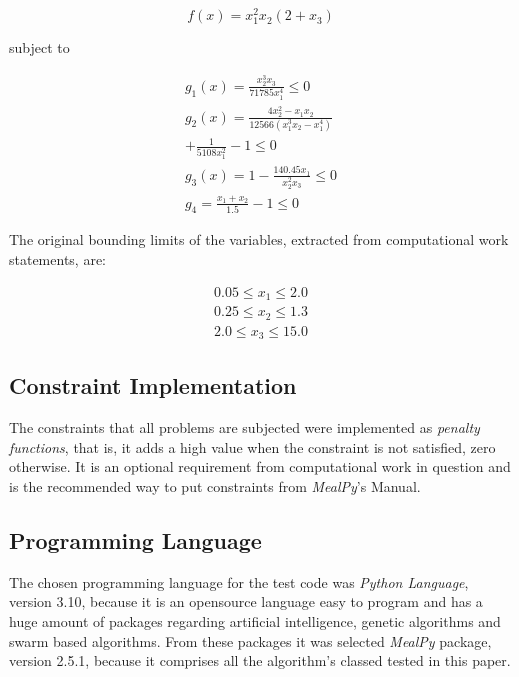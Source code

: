 \documentclass[conference]{IEEEtran}
\begin{document}
\begin{equation}
    f (x) = x_1^2 x_2 (2 + x_3)
\end{equation}

subject to

\begin{equation}
    \begin{split}
        g_1(x) = \frac{x_2^3 x_3}{71785 x_1^4} \leq 0\\
        g_2(x) = \frac{4 x_2^2 - x_1 x_2}{12566 \left( x_1^3 x_2 - x_1^4\right)}\\
        + \frac{1}{5108 x_1^2} -1 \leq 0\\
        g_3(x) = 1 - \frac{140.45 x_1}{x_2^2 x_3} \leq 0\\
        g_4 = \frac{x_1 + x_2}{1.5} - 1 \leq 0
    \end{split}
\end{equation}

The original bounding limits of the variables, extracted from computational work
statements, are:

\begin{equation}
    \begin{split}
        0.05 \leq x_1 \leq 2.0\\
        0.25 \leq x_2 \leq 1.3\\
        2.0 \leq x_3 \leq 15.0
    \end{split}
\end{equation}

\subsection{Constraint Implementation}
\label{subsec:methodology-constraint-implementation}
The constraints that all problems are subjected were implemented as \textit{penalty functions},
that is, it adds a high value when the constraint is not satisfied, zero otherwise. It is an optional requirement
from computational work in question and is the recommended way to put constraints from \textit{MealPy}'s
Manual.

\subsection{Programming Language}
\label{subsec:methodology-programming-language}

The chosen programming language for the test code was \textit{Python Language}, version 3.10, because it is an opensource language easy to
program and has a huge amount of packages regarding artificial intelligence, genetic algorithms and swarm based algorithms.
From these packages it was selected \textit{MealPy} package, version 2.5.1, because it comprises all the algorithm's classed tested in this paper.
\end{document}
